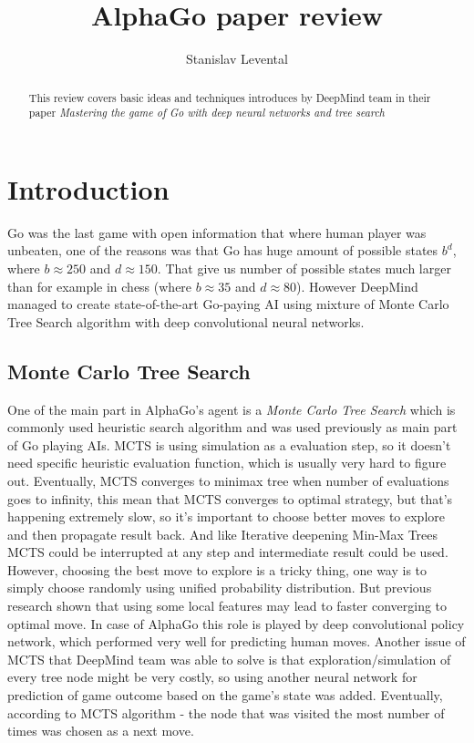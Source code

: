 \documentclass[11pt]{article}
\title{\LARGE \bf AlphaGo paper review}
\author{Stanislav Levental}
\begin{document}
\maketitle

\begin{abstract}

This review covers basic ideas and techniques introduces by DeepMind team in their paper \textit{Mastering the game of Go with deep
neural networks and tree search \cite{alphago}}

\end{abstract}

\section{Introduction}

Go was the last game with open information that where human player was unbeaten, one of the reasons was that Go \cite{goweb} has huge amount of possible states $b^d$, where $b\approx250$ and $d\approx150$. That give us number of possible states much larger than for example in chess (where $b\approx35$ and $d\approx80$). However DeepMind managed to create state-of-the-art Go-paying AI using mixture of Monte Carlo Tree Search algorithm with deep convolutional neural networks.

\subsection{Monte Carlo Tree Search}

One of the main part in AlphaGo's agent is a \textit{Monte Carlo Tree Search}\cite{mcts} which is commonly used heuristic search algorithm and was used previously as main part of Go playing AIs. MCTS is using simulation as a evaluation step, so it doesn't need specific heuristic evaluation function, which is usually very hard to figure out. Eventually, MCTS converges to minimax tree \cite{mcts_minimax} when number of evaluations goes to infinity, this mean that MCTS converges to optimal strategy, but that's happening extremely slow, so it's important to choose better moves to explore and then propagate result back. And like Iterative deepening Min-Max Trees MCTS could be interrupted at any step and intermediate result could be used. However, choosing the best move to explore is a tricky thing, one way is to simply choose randomly using unified probability distribution. But previous research shown that using some local features may lead to faster converging to optimal move. In case of AlphaGo this role is played by deep convolutional policy network, which performed very well for predicting human moves. Another issue of MCTS that DeepMind team was able to solve is that exploration/simulation of every tree node might be very costly, so using another neural network for prediction of game outcome based on the game's state was added. Eventually, according to MCTS algorithm - the node that was visited the most number of times was chosen as a next move.  
\end{document}
